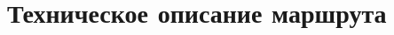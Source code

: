 \setlength{\arrayrulewidth}{0.2mm}
\setlength{\tabcolsep}{2pt}
\renewcommand{\arraystretch}{1}

\section{Техническое описание маршрута}\label{sec:technical_description}
	
	

\setlength{\arrayrulewidth}{0.3mm}
\setlength{\arraycolsep}{5pt}
\renewcommand{\arraystretch}{1.8}